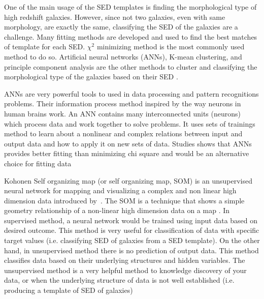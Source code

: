 One of the main usage of the SED templates is finding the morphological type of high redshift galaxies. %
However, since not two galaxies, even with same morphology, are exactly the same, classifying the SED of the galaxies are a challenge.
Many fitting methods are developed and used to find the best matches of template for each SED.
$\chi^2$ minimizing method is the most commonly used method to do so. 
Artificial neural networks (ANNs), K-mean clustering, and principle component analysis are the other methods to cluster and classifying the morphological type of the galaxies based on their SED \citep[e.g.][]{Allen13,Ordov14,Shi15}.

ANNs are very powerful tools to used in data processing and pattern recognitions problems.
Their information process method inspired by the way neurons in human brains work.
An ANN contains many interconnected units (neurons) which process data and work together to solve problems.
It uses sets of trainings method to learn about a nonlinear and complex relations between input and output data and how to apply it on new sets of data.
Studies shows that ANNs provides better fitting than minimizing chi square and would be an alternative choice for fitting data \citep[e.g.][]{Marquez91,Moayed09} %

Kohonen Self organizing map (or self organizing map, SOM) is an unsupervised neural network for mapping and visualizing a complex and non linear high dimension data introduced by~\citep{Kohonen82}.
The SOM is a technique that shows a simple geometry relationship of a non-linear high dimension data on a map \citep{Kohonen98}.
In supervised method, a neural network would be trained using input data based on desired outcome.
This method is very useful for classification of data with specific target values (i.e. classifying SED of galaxies from a SED template).
On the other hand, in unsupervised method there is no prediction of output data.
This method classifies data based on their underlying structures and hidden variables.
The unsupervised method is a very helpful method to knowledge discovery of your data, or when the underlying structure of data is not well established (i.e. producing a template of SED of galaxies) %

